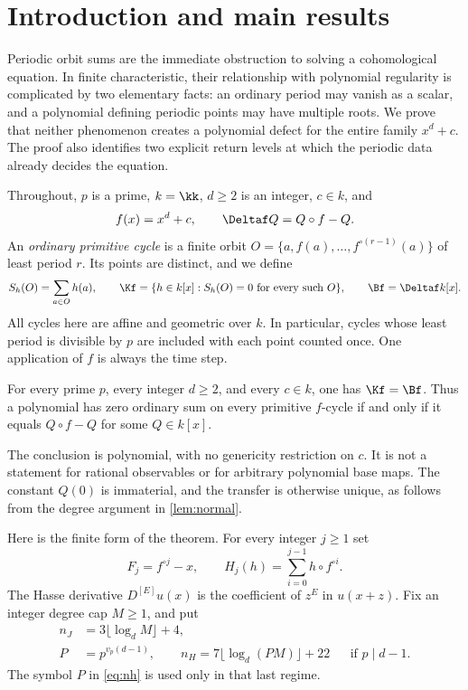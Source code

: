 \section{Introduction and main results}
\label{sec:introduction}

Periodic orbit sums are the immediate obstruction to solving a
cohomological equation. In finite characteristic, their relationship
with polynomial regularity is complicated by two elementary facts:
an ordinary period may vanish as a scalar, and a polynomial defining
periodic points may have multiple roots. We prove that neither
phenomenon creates a polynomial defect for the entire family
$x^d+c$. The proof also identifies two explicit return levels at
which the periodic data already decides the equation.

Throughout, $p$ is a prime, $k=\kk$, $d\ge2$ is an integer,
$c\in k$, and
\begin{equation}
 f(x)=x^d+c,\qquad \Deltaf Q=Q\circ f-Q.
 \label{eq:setup}
\end{equation}
An \emph{ordinary primitive cycle} is a finite orbit
$O=\{a,f(a),\ldots,f^{\circ(r-1)}(a)\}$ of least period $r$.
Its points are distinct, and we define
\[
 S_h(O)=\sum_{a\in O}h(a),\qquad
 \Kf=\{h\in k[x]:S_h(O)=0\text{ for every such }O\},
 \qquad \Bf=\Deltaf k[x].
\]
All cycles here are affine and geometric over $k$. In particular,
cycles whose least period is divisible by $p$ are included with
each point counted once. One application of $f$ is always the
time step.

\begin{theorem}
\label{thm:rigidity}
For every prime $p$, every integer $d\ge2$, and every $c\in k$,
one has $\Kf=\Bf$. Thus a polynomial has zero ordinary sum on
every primitive $f$-cycle if and only if it equals $Q\circ f-Q$
for some $Q\in k[x]$.
\end{theorem}

The conclusion is polynomial, with no genericity restriction on $c$.
It is not a statement for rational observables or for arbitrary
polynomial base maps. The constant $Q(0)$ is immaterial, and the
transfer is otherwise unique, as follows from the degree argument
in \cref{lem:normal}.

Here is the finite form of the theorem. For every integer $j\ge1$ set
\begin{equation}
 F_j=f^{\circ j}-x,\qquad
 H_j(h)=\sum_{i=0}^{j-1}h\circ f^{\circ i}.
 \label{eq:returns}
\end{equation}
The Hasse derivative $D^{[E]}u(x)$ is the coefficient of $z^E$
in $u(x+z)$. Fix an integer degree cap $M\ge1$, and put
\begin{align}
 n_J&=3\lfloor\log_dM\rfloor+4,\label{eq:nj}\\
 P&=p^{v_p(d-1)},\qquad
 n_H=7\lfloor\log_d(PM)\rfloor+22
       &&\text{if }p\mid d-1.\label{eq:nh}
\end{align}
The symbol $P$ in \eqref{eq:nh} is used only in that last regime.

